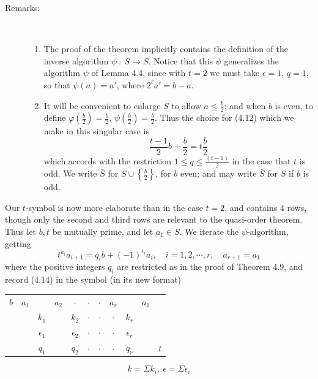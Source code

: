\begin{description}
  \item[Remarks:] $\ $
    \begin{enumerate}[\hspace{1cm}(i)]
      \item The proof of the theorem implicitly contains the definition of the inverse algorithm $\psi\ :\ S \rightarrow S$. Notice that this $\psi$ generalizes the algorithm $\psi$ of Lemma 4.4, since with $t = 2$ we must take $\epsilon = 1$, $q = 1$, so that $\psi(a) = a'$, where $2^{\ell} a' = b-a$.
      \item It will be convenient to enlarge $S$ to allow $a \leq \frac{b}{2}$; and when $b$ is even, to define $\varphi \left( \frac{b}{2} \right) = \frac{b}{2}$, $\psi \left( \frac{b}{2} \right) = \frac{b}{2}$. Thus the choice for (4.12) which we make in this singular case is
        \begin{equation*}
        \frac{t-1}{2} b + \frac{b}{2} = t \frac{b}{2}
        \end{equation*}
        which accords with the restriction $1 \leq q \leq \frac{(t-1)}{2}$ in the case that $t$ is odd. We write $\bar{S}$ for $S \cup \left\{ \frac{b}{2} \right\}$, for $b$ even; and may write $\bar{S}$ for $S$ if $b$ is odd.
    \end{enumerate}

\end{description}

Our $t$-symbol is now more elaborate than in the case $t = 2$, and contains 4 rows, though only the second and third rows are relevant to the quasi-order theorem. Thus let $b,t$ be mutually prime, and let $a_{1} \in S$. We iterate the $\psi$-algorithm, getting
\begin{equation}
t^{k_i} a_{i+1} = q_{i} b + (-1)^{\epsilon_i} a_{i}, \quad i = 1,2,\cdots,r, \quad a_{r+1} = a_{1}  \tag{4.14}
\end{equation}
where the positive integers $q_{i}$ are restricted as in the proof of Theorem 4.9, and record (4.14) in the symbol (in its new format)

\begin{tabular}{l|ccccccccc|r}
$b$ & $a_{1}$ &                & $a_{2}$ &     $\cdot$    & $\cdot$ & $\cdot$ & $a_{r}$ &                & $a_{1}$ &     \\
    &         & $k_{1}$        &         & $k_{2}$        & $\cdot$ & $\cdot$ & $\cdot$ & $k_{r}$        &         &     \\
    &         & $\epsilon_{1}$ &         & $\epsilon_{2}$ & $\cdot$ & $\cdot$ & $\cdot$ & $\epsilon_{r}$ &         &     \\
    &         & $q_{1}$        &         & $q_{2}$        & $\cdot$ & $\cdot$ & $\cdot$ & $q_{r}$        &         & $t$ 
\end{tabular} 
\begin{equation}
k = \Sigma k_{i},\ \epsilon = \Sigma \epsilon_{i}  \tag{4.15}
\end{equation}


